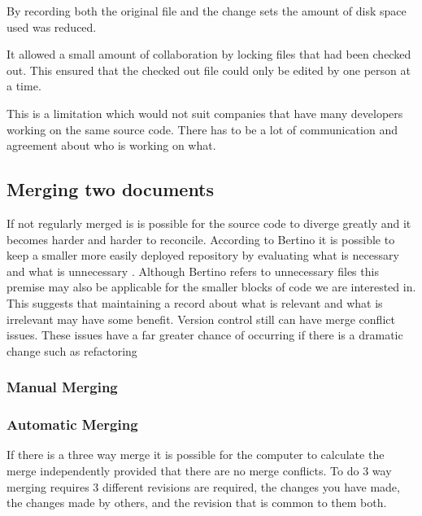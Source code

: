 By recording both the original file and the change sets the amount of disk space used was reduced. 

It allowed a small amount of collaboration by locking files that had been checked out.
This ensured that the checked out file could only be edited by one person at a time.

This is a limitation which would not suit companies that have many developers working on the same source code.  
There has to be a lot of communication and agreement about who is working on what.

\subsection{Merging two documents}

If not regularly merged is is possible for the source code to diverge greatly and it becomes harder and harder to reconcile.
 According to Bertino it is possible to keep a smaller more easily deployed repository by evaluating what is necessary and what is unnecessary \cite{Bertino2012}. Although Bertino refers to unnecessary files this premise may also be applicable for the smaller blocks of code we are interested in. This suggests that maintaining a record about what is relevant and what is irrelevant may have some benefit. Version control still can have merge conflict issues. These issues have a far greater chance of occurring if there is a dramatic change such as refactoring
 
\subsubsection{Manual Merging}



\subsubsection{Automatic Merging}
If there is a three way merge it is possible for the computer to calculate the merge independently provided that there are no merge conflicts.
To do 3 way merging requires 3 different revisions are required, the changes you have made, the changes made by others, and the revision that is common to them both.


